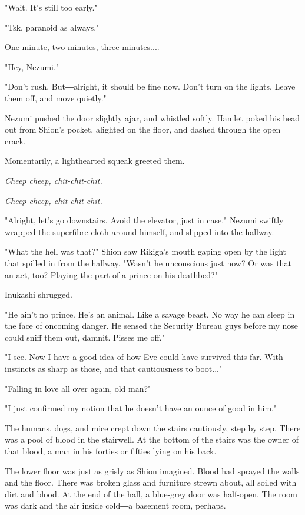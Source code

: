 "Wait. It's still too early."

"Tsk, paranoid as always."

One minute, two minutes, three minutes....

"Hey, Nezumi."

"Don't rush. But―alright, it should be fine now. Don't turn on the
lights. Leave them off, and move quietly."

Nezumi pushed the door slightly ajar, and whistled softly. Hamlet poked
his head out from Shion's pocket, alighted on the floor, and dashed
through the open crack.

Momentarily, a lighthearted squeak greeted them.

\emph{Cheep cheep, chit-chit-chit.}

\emph{Cheep cheep, chit-chit-chit.}

"Alright, let's go downstairs. Avoid the elevator, just in case." Nezumi
swiftly wrapped the superfibre cloth around himself, and slipped into
the hallway.

"What the hell was that?" Shion saw Rikiga's mouth gaping open by the
light that spilled in from the hallway. "Wasn't he unconscious just now?
Or was that an act, too? Playing the part of a prince on his deathbed?"

Inukashi shrugged.

"He ain't no prince. He's an animal. Like a savage beast. No way he can
sleep in the face of oncoming danger. He sensed the Security Bureau guys
before my nose could sniff them out, damnit. Pisses me off."

"I see. Now I have a good idea of how Eve could have survived this far.
With instincts as sharp as those, and that cautiousness to boot..."

"Falling in love all over again, old man?"

"I just confirmed my notion that he doesn't have an ounce of good in
him."

The humans, dogs, and mice crept down the stairs cautiously, step by
step. There was a pool of blood in the stairwell. At the bottom of the
stairs was the owner of that blood, a man in his forties or fifties
lying on his back.

The lower floor was just as grisly as Shion imagined. Blood had sprayed
the walls and the floor. There was broken glass and furniture strewn
about, all soiled with dirt and blood. At the end of the hall, a
blue-grey door was half-open. The room was dark and the air inside
cold―a basement room, perhaps.

